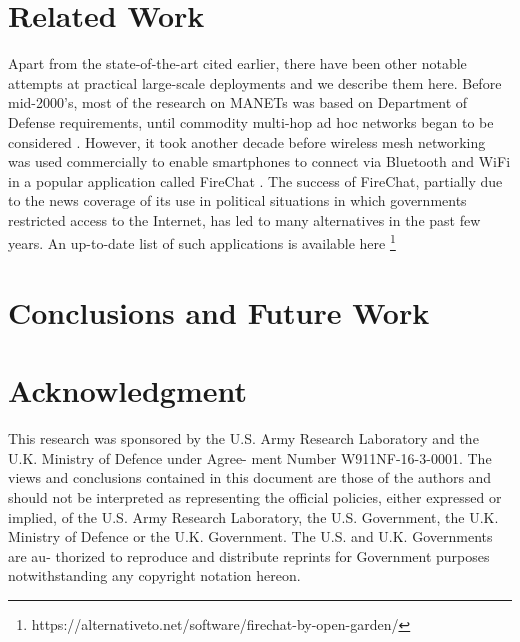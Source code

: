 \documentclass[conference]{IEEEtran}
\begin{document}
%
\section{Related Work}
\label{sec:related}
%
Apart from the state-of-the-art cited earlier, there have been other
notable attempts at practical large-scale deployments and we describe
them here. Before mid-2000’s, most of the research on MANETs was based
on Department of Defense requirements, until commodity multi-hop ad
hoc networks began to be considered \cite{bruno-mesh-2005}. However,
it took another decade before wireless mesh networking was used
commercially to enable smartphones to connect via Bluetooth and WiFi
in a popular application called FireChat \cite{firechat}. The success
of FireChat, partially due to the news coverage of its use in
political situations in which governments restricted access to the
Internet, has led to many alternatives in the past few years. An
up-to-date list of such applications is available
here \footnote{https://alternativeto.net/software/firechat-by-open-garden/}
\section{Conclusions and Future Work}
\label{sec:conclude}

\section*{Acknowledgment}
This research was sponsored by the U.S. Army Research Laboratory and
the U.K. Ministry of Defence under Agree- ment Number
W911NF-16-3-0001. The views and conclusions contained in this document
are those of the authors and should not be interpreted as representing
the official policies, either expressed or implied, of the U.S. Army
Research Laboratory, the U.S. Government, the U.K. Ministry of Defence
or the U.K. Government. The U.S. and U.K. Governments are au- thorized
to reproduce and distribute reprints for Government purposes
notwithstanding any copyright notation hereon.
 
\end{document}
